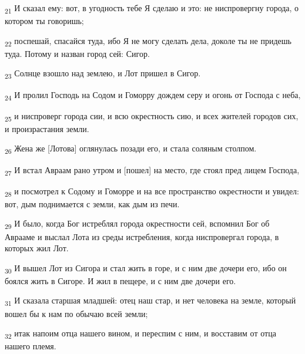 \begin{tcolorbox}
\textsubscript{21} И сказал ему: вот, в угодность тебе Я сделаю и это: не ниспровергну города, о котором ты говоришь;
\end{tcolorbox}
\begin{tcolorbox}
\textsubscript{22} поспешай, спасайся туда, ибо Я не могу сделать дела, доколе ты не придешь туда. Потому и назван город сей: Сигор.
\end{tcolorbox}
\begin{tcolorbox}
\textsubscript{23} Солнце взошло над землею, и Лот пришел в Сигор.
\end{tcolorbox}
\begin{tcolorbox}
\textsubscript{24} И пролил Господь на Содом и Гоморру дождем серу и огонь от Господа с неба,
\end{tcolorbox}
\begin{tcolorbox}
\textsubscript{25} и ниспроверг города сии, и всю окрестность сию, и всех жителей городов сих, и произрастания земли.
\end{tcolorbox}
\begin{tcolorbox}
\textsubscript{26} Жена же [Лотова] оглянулась позади его, и стала соляным столпом.
\end{tcolorbox}
\begin{tcolorbox}
\textsubscript{27} И встал Авраам рано утром и [пошел] на место, где стоял пред лицем Господа,
\end{tcolorbox}
\begin{tcolorbox}
\textsubscript{28} и посмотрел к Содому и Гоморре и на все пространство окрестности и увидел: вот, дым поднимается с земли, как дым из печи.
\end{tcolorbox}
\begin{tcolorbox}
\textsubscript{29} И было, когда Бог истреблял города окрестности сей, вспомнил Бог об Аврааме и выслал Лота из среды истребления, когда ниспровергал города, в которых жил Лот.
\end{tcolorbox}
\begin{tcolorbox}
\textsubscript{30} И вышел Лот из Сигора и стал жить в горе, и с ним две дочери его, ибо он боялся жить в Сигоре. И жил в пещере, и с ним две дочери его.
\end{tcolorbox}
\begin{tcolorbox}
\textsubscript{31} И сказала старшая младшей: отец наш стар, и нет человека на земле, который вошел бы к нам по обычаю всей земли;
\end{tcolorbox}
\begin{tcolorbox}
\textsubscript{32} итак напоим отца нашего вином, и переспим с ним, и восставим от отца нашего племя.
\end{tcolorbox}
